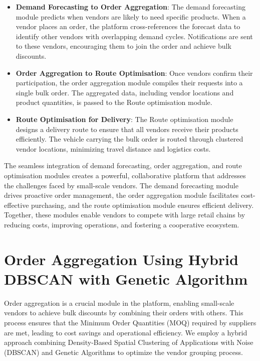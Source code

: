 \begin{itemize}
    \item \textbf{Demand Forecasting to Order Aggregation}: The demand forecasting module predicts when vendors are likely to need specific products. When a vendor places an order, the platform cross-references the forecast data to identify other vendors with overlapping demand cycles. Notifications are sent to these vendors, encouraging them to join the order and achieve bulk discounts.
    \item \textbf{Order Aggregation to Route Optimisation}: Once vendors confirm their participation, the order aggregation module compiles their requests into a single bulk order. The aggregated data, including vendor locations and product quantities, is passed to the Route optimisation module.
    \item \textbf{Route Optimisation for Delivery}: The Route optimisation module designs a delivery route to ensure that all vendors receive their products efficiently. The vehicle carrying the bulk order is routed through clustered vendor locations, minimizing travel distance and logistics costs.
\end{itemize}



The seamless integration of demand forecasting, order aggregation, and route optimisation modules creates a powerful, collaborative platform that addresses the challenges faced by small-scale vendors. The demand forecasting module drives proactive order management, the order aggregation module facilitates cost-effective purchasing, and the route optimisation module ensures efficient delivery. Together, these modules enable vendors to compete with large retail chains by reducing costs, improving operations, and fostering a cooperative ecosystem.





\section{Order Aggregation Using Hybrid DBSCAN with Genetic Algorithm}

Order aggregation is a crucial module in the platform, enabling small-scale vendors to achieve bulk discounts by combining their orders with others. This process ensures that the Minimum Order Quantities (MOQ) required by suppliers are met, leading to cost savings and operational efficiency. We employ a hybrid approach combining Density-Based Spatial Clustering of Applications with Noise (DBSCAN) and Genetic Algorithms to optimize the vendor grouping process.

